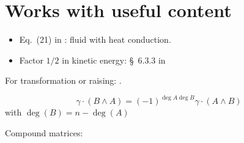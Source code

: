 \documentclass[\ifafour a4paper,12pt,\else a5paper,10pt,\fi%
onecolumn,oneside,article,%
british%
]{memoir}
\theoremstyle{remark}
\theoremstyle{innote}
\renewcommand*{\finalnamedelim}{\addspace\amp\space}
\newcommand*{\amp}{\&}
\renewcommand*{\|}[1][]{\nonscript\:#1\vert\nonscript\:\mathopen{}}
\newcommand*{\sect}{\S}%
\newcommand*{\eqn}{eq.}%
\begin{document}
\section{Works with useful content}
\label{sec:works}

\begin{itemize}
\item Eq.~(21) in \autocites{maugin1974b}: fluid with heat conduction.
\item Factor $1/2$ in kinetic energy: \sect~6.3.3 in \autocites{gourgoulhon2007_r2012}
\end{itemize}

For transformation or raising:  \autocites[\sect~I.4 \eqn~(33)]{gantmacher1959_r2000}.

\begin{equation}
  \gamma\cdot (B\land A) = (-1)^{\deg{A}\deg{B}} \gamma\cdot(A \land B)
\end{equation}
with $\deg(B) = n-\deg(A)$
\autocites[prop.~4.1]{barnabeietal1985}




Compound matrices:  \autocites[\sect~IV.A.1 p.~199, Problem~1 p.~270]{choquetbruhatetal1977_r1996}

 
\renewcommand*{\finalnamedelim}{\addcomma\space}

\printbibliography[prenote=prenote%
]
\end{document}
